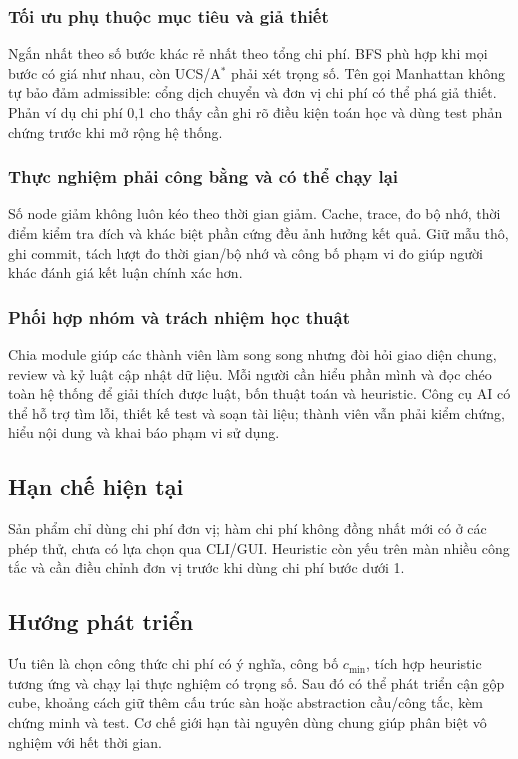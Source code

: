 \documentclass[a4paper]{article}
\newcommand{\astar}{\texorpdfstring{A\ensuremath{^*}}{A*}}
\begin{document}
\subsubsection{Tối ưu phụ thuộc mục tiêu và giả thiết}
Ngắn nhất theo số bước khác rẻ nhất theo tổng chi phí. BFS phù hợp khi mọi bước có giá như nhau, còn UCS/\astar{} phải xét trọng số. Tên gọi Manhattan không tự bảo đảm admissible: cổng dịch chuyển và đơn vị chi phí có thể phá giả thiết. Phản ví dụ chi phí 0,1 cho thấy cần ghi rõ điều kiện toán học và dùng test phản chứng trước khi mở rộng hệ thống.

\subsubsection{Thực nghiệm phải công bằng và có thể chạy lại}
Số node giảm không luôn kéo theo thời gian giảm. Cache, trace, đo bộ nhớ, thời điểm kiểm tra đích và khác biệt phần cứng đều ảnh hưởng kết quả. Giữ mẫu thô, ghi commit, tách lượt đo thời gian/bộ nhớ và công bố phạm vi đo giúp người khác đánh giá kết luận chính xác hơn.

\subsubsection{Phối hợp nhóm và trách nhiệm học thuật}
Chia module giúp các thành viên làm song song nhưng đòi hỏi giao diện chung, review và kỷ luật cập nhật dữ liệu. Mỗi người cần hiểu phần mình và đọc chéo toàn hệ thống để giải thích được luật, bốn thuật toán và heuristic. Công cụ AI có thể hỗ trợ tìm lỗi, thiết kế test và soạn tài liệu; thành viên vẫn phải kiểm chứng, hiểu nội dung và khai báo phạm vi sử dụng.





\subsection{Hạn chế hiện tại}
Sản phẩm chỉ dùng chi phí đơn vị; hàm chi phí không đồng nhất mới có ở các phép thử, chưa có lựa chọn qua CLI/GUI. Heuristic còn yếu trên màn nhiều công tắc và cần điều chỉnh đơn vị trước khi dùng chi phí bước dưới 1. 

\subsection{Hướng phát triển}
Ưu tiên là chọn công thức chi phí có ý nghĩa, công bố $c_{\min}$, tích hợp heuristic tương ứng và chạy lại thực nghiệm có trọng số. Sau đó có thể phát triển cận gộp cube, khoảng cách giữ thêm cấu trúc sàn hoặc abstraction cầu/công tắc, kèm chứng minh và test. Cơ chế giới hạn tài nguyên dùng chung giúp phân biệt vô nghiệm với hết thời gian. 
\end{document}
